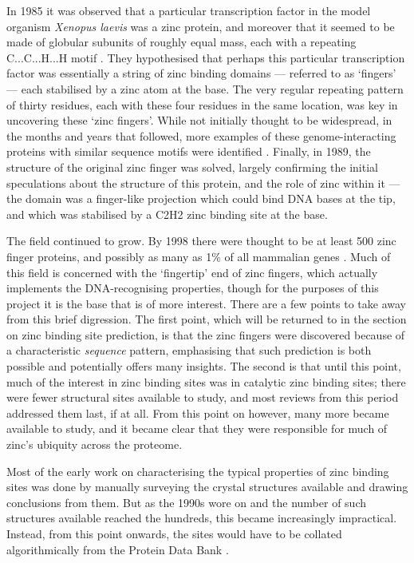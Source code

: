 In 1985 it was observed that a particular transcription factor in the model organism \emph{Xenopus laevis} was a zinc protein, and moreover that it seemed to be made of globular subunits of roughly equal mass, each with a repeating C...C...H...H motif \cite{miller1985repetitive}. They hypothesised that perhaps this particular transcription factor was essentially a string of zinc binding domains --- referred to as `fingers' --- each stabilised by a zinc atom at the base. The very regular repeating pattern of thirty residues, each with these four residues in the same location, was key in uncovering these `zinc fingers'. While not initially thought to be widespread, in the months and years that followed, more examples of these genome-interacting proteins with similar sequence motifs were identified \cite{payre1988finger}. Finally, in 1989, the structure of the original zinc finger was solved, largely confirming the initial speculations about the structure of this protein, and the role of zinc within it --- the domain was a finger-like projection which could bind DNA bases at the tip, and which was stabilised by a C2H2 zinc binding site at the base.

The field continued to grow. By 1998 there were thought to be at least 500 zinc finger proteins, and possibly as many as 1\% of all mammalian genes \cite{mackay1998zinc}. Much of this field is concerned with the `fingertip' end of zinc fingers, which actually implements the DNA-recognising properties, though for the purposes of this project it is the base that is of more interest. There are a few points to take away from this brief digression. The first point, which will be returned to in the section on zinc binding site prediction, is that the zinc fingers were discovered because of a characteristic \textit{sequence} pattern, emphasising that such prediction is both possible and potentially offers many insights. The second is that until this point, much of the interest in zinc binding sites was in catalytic zinc binding sites; there were fewer structural sites available to study, and most reviews from this period addressed them last, if at all. From this point on however, many more became available to study, and it became clear that they were responsible for much of zinc's ubiquity across the proteome.

Most of the early work on characterising the typical properties of zinc binding sites was done by manually surveying the crystal structures available and drawing conclusions from them. But as the 1990s wore on and the number of such structures available reached the hundreds, this became increasingly impractical. Instead, from this point onwards, the sites would have to be collated algorithmically from the Protein Data Bank \cite{berman2000pdb}.

